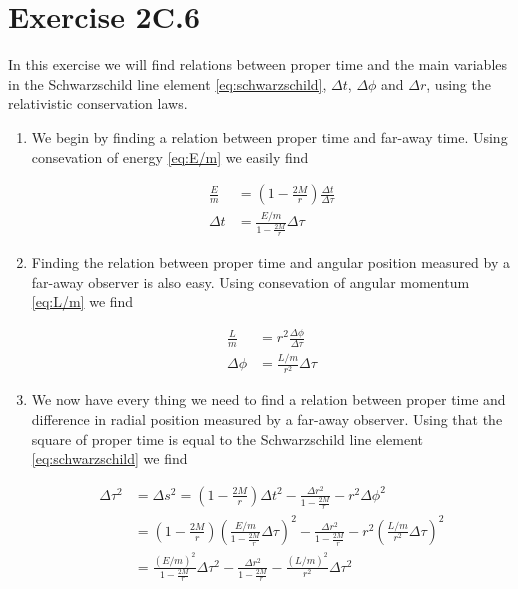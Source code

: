 \documentclass[a4paper,10pt,english]{article}
\begin{document}
\section*{Exercise 2C.6}

In this exercise we will find relations between proper time and the main variables in the Schwarzschild line element \ref{eq:schwarzschild}, $\Delta t$, $\Delta \phi$ and $\Delta r$, using the relativistic conservation laws.

\begin{enumerate}

\item We begin by finding a relation between proper time and far-away time. Using consevation of energy \ref{eq:E/m} we easily find

\begin{align*}
\frac{E}{m}&=\left(1-\frac{2M}{r}\right)\frac{\Delta t}{\Delta\tau}\\
\Delta t&=\frac{E/m}{1-\frac{2M}{r}}\Delta\tau
\end{align*}

\item Finding the relation between proper time and angular position measured by a far-away observer is also easy. Using consevation of angular momentum \ref{eq:L/m} we find

\begin{align*}
\frac{L}{m}&=r^{2}\frac{\Delta\phi}{\Delta\tau}\\
\Delta\phi&=\frac{L/m}{r^{2}}\Delta\tau
\end{align*}

\item We now have every thing we need to find a relation between proper time and difference in radial position measured by a far-away observer. Using that the square of proper time is equal to the Schwarzschild line element \ref{eq:schwarzschild} we find

\begin{align*}
\Delta\tau^{2}&=\Delta s^{2}=\left(1-\frac{2M}{r}\right)\Delta t^{2}-\frac{\Delta r^{2}}{1-\frac{2M}{r}}-r^{2}\Delta\phi^{2}\\
&=\left(1-\frac{2M}{r}\right)\left(\frac{E/m}{1-\frac{2M}{r}}\Delta\tau\right)^{2}-\frac{\Delta r^{2}}{1-\frac{2M}{r}}-r^{2}\left(\frac{L/m}{r^{2}}\Delta\tau\right)^{2}\\
&=\frac{(E/m)^{2}}{1-\frac{2M}{r}}\Delta\tau^{2}-\frac{\Delta r^{2}}{1-\frac{2M}{r}}-\frac{(L/m)^{2}}{r^{2}}\Delta\tau^{2}
\end{align*}


\end{enumerate}
\end{document}
